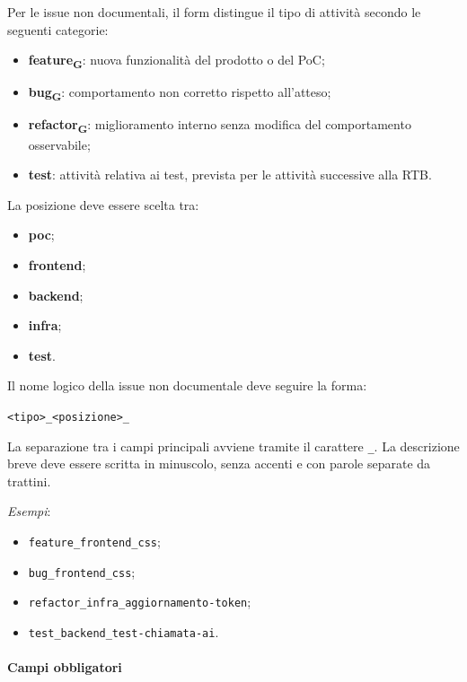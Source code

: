 Per le issue non documentali, il form distingue il tipo di attività secondo le
seguenti categorie:

\begin{itemize}
    \item \textbf{feature\textsubscript{G}}: nuova funzionalità del prodotto o del PoC;
    \item \textbf{bug\textsubscript{G}}: comportamento non corretto rispetto all'atteso;
    \item \textbf{refactor\textsubscript{G}}: miglioramento interno senza modifica del comportamento
    osservabile;
    \item \textbf{test}: attività relativa ai test, prevista per le attività successive
    alla RTB.
\end{itemize}

La posizione deve essere scelta tra:

\begin{itemize}
    \item \textbf{poc};
    \item \textbf{frontend};
    \item \textbf{backend};
    \item \textbf{infra};
    \item \textbf{test}.
\end{itemize}

Il nome logico della issue non documentale deve seguire la forma:

\begin{center}
    \texttt{<tipo>\_<posizione>\_<descrizione-breve>}
\end{center}

La separazione tra i campi principali avviene tramite il carattere
\texttt{\_}. La descrizione breve deve essere scritta in minuscolo, senza accenti
e con parole separate da trattini.

\textit{Esempi}:

\begin{itemize}
    \item \texttt{feature\_frontend\_css};
    \item \texttt{bug\_frontend\_css};
    \item \texttt{refactor\_infra\_aggiornamento-token};
    \item \texttt{test\_backend\_test-chiamata-ai}.
\end{itemize}

\paragraph{Campi obbligatori}

